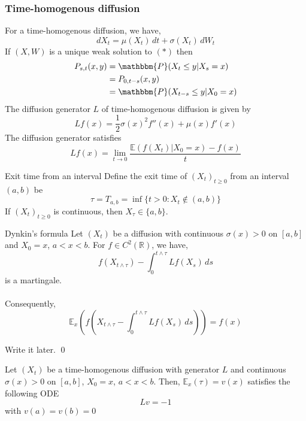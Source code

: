 \documentclass[12pt,a4paper]{article}
\newcommand{\R}{\mathbb{R}}
\newcommand{\E}{\mathbb{E}}
\renewenvironment{proof}
    {\begin{trivlist}\item[\hskip\labelsep\color{blue}\bfseries Proof:]}
    {\qed\end{trivlist}}
\begin{document}
    \subsubsection{Time-homogenous diffusion}
    For a time-homogenous diffusion, we have,
    \begin{equation*}
        dX_t = \mu(X_t)\, dt + \sigma(X_t)\, dW_t\tag{$*$}
    \end{equation*}
    If $(X,W)$ is a unique weak solution to $(*)$ then
    \begin{align*}
        P_{s,t}(x,y) & = \mathbbm{P}(X_t\le y|X_s=x)\\
        &= P_{0,t-s}(x,y)\\
        &=\mathbbm{P}(X_{t-s}\le y|X_0=x)
    \end{align*}
    The diffusion generator $L$ of time-homogenous diffusion is given by
    $$
    Lf(x) = \frac{1}{2}\sigma(x)^2f''(x) + \mu(x)f'(x)
    $$
    The diffusion generator satisfies
    $$
    Lf(x) = \lim_{t\to 0}\frac{\E(f(X_t)|X_0=x)-f(x)}{t}
    $$
    \begin{definition}{Exit time from an interval}{}
        Define the exit time of $(X_t)_{t\ge 0}$ from an interval $(a,b)$ be
        $$
        \tau = T_{a,b} = \inf\{t>0: X_t\not\in (a,b)\}
        $$
        If $(X_t)_{t\ge 0}$ is continuous, then $X_\tau \in \{a,b\}$.
    \end{definition}
    \begin{theorem}{Dynkin's formula}{}
        Let $(X_t)$ be a diffusion with continuous $\sigma(x)>0$ on $[a,b]$ and $X_0=x$, $a<x<b$. For $f\in C^2(\R)$, we have,
        $$
        f(X_{t\wedge\tau}) -\int_0^{t\wedge\tau} Lf(X_s)\, ds
        $$
        is a martingale.\\
        \\
        Consequently,
        $$
        \E_x\left(f(X_{t\wedge\tau}-\int_0^{t\wedge\tau}Lf(X_s)\, ds)\right) = f(x)
        $$
    \end{theorem}
    \begin{proof}
        Write it later.
    \end{proof}
    \begin{theorem}{}{}
        Let $(X_t)$ be a time-homogenous diffusion with generator $L$ and continuous $\sigma(x)>0$ on $[a,b]$, $X_0=x$, $a<x<b$. Then, $\E_x(\tau) =v(x)$ satisfies the following ODE
        $$
        Lv=-1
        $$
        with $v(a)=v(b)=0$
    \end{theorem}
    \pagebreak
\end{document}
